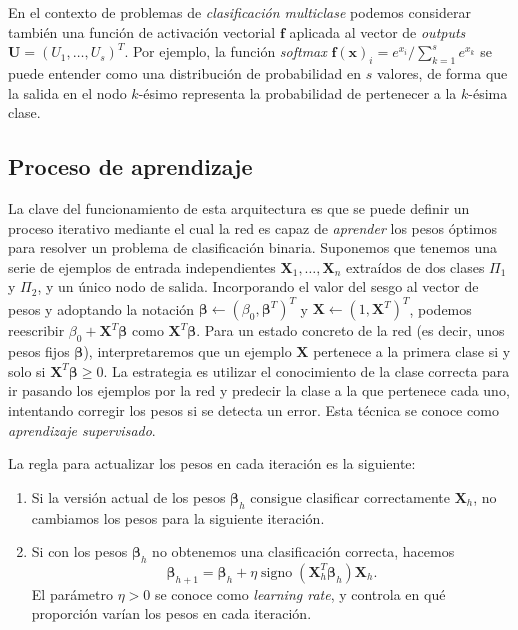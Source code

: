 \documentclass[
  a4paper,
  12pt,
  spanish,
]{scrartcl}
\theoremstyle{teorema-style}
\begin{document}
En el contexto de problemas de \textit{clasificación multiclase} podemos considerar también una función de activación vectorial $\pmb f$ aplicada al vector de \textit{outputs} $\pmb U = (U_1, \dots, U_s)^T$. Por ejemplo, la función \textit{softmax} $\pmb f(\pmb x)_i = e^{x_i}/\sum_{k=1}^s e^{x_k}$ se puede entender como una distribución de probabilidad en $s$ valores, de forma que la salida en el nodo $k$-ésimo representa la probabilidad de pertenecer a la $k$-ésima clase.

\subsection{Proceso de aprendizaje}

La clave del funcionamiento de esta arquitectura es que se puede definir un proceso iterativo mediante el cual la red es capaz de \textit{aprender} los pesos óptimos para resolver un problema de clasificación binaria. Suponemos que tenemos una serie de ejemplos de entrada independientes $\pmb X_1, \dots, \pmb X_n$ extraídos de dos clases $\Pi_1$ y $\Pi_2$, y un único nodo de salida. Incorporando el valor del sesgo al vector de pesos y adoptando la notación $\pmb \beta \leftarrow (\beta_0, \pmb \beta^T)^T$ y $\pmb X \leftarrow (1, \pmb X^T)^T$, podemos reescribir $\beta_{0} + \mathbf{X}^T \pmb{\beta}$ como $\mathbf{X}^T \pmb{\beta}$. Para un estado concreto de la red (es decir, unos pesos fijos $\pmb \beta$), interpretaremos que un ejemplo $\pmb X$ pertenece a la primera clase si y solo si $\pmb X^T \pmb \beta \ge 0$. La estrategia es utilizar el conocimiento de la clase correcta para ir pasando los ejemplos por la red y predecir la clase a la que pertenece cada uno, intentando corregir los pesos si se detecta un error. Esta técnica se conoce como \textit{aprendizaje supervisado}.

La regla para actualizar los pesos en cada iteración es la siguiente:
\begin{enumerate}
  \item Si la versión actual de los pesos $\pmb \beta_h$ consigue clasificar correctamente $\pmb X_h$, no cambiamos los pesos para la siguiente iteración.
  \item Si con los pesos $\pmb \beta_h$ no obtenemos una clasificación correcta, hacemos
\[
  \pmb \beta_{h+1} = \pmb \beta_h + \eta \operatorname{signo}(\pmb X^T_h \pmb \beta_h) \pmb X_h.
\]
El parámetro $\eta > 0$ se conoce como \textit{learning rate}, y controla en qué proporción varían los pesos en cada iteración.
\end{enumerate}
\end{document}
